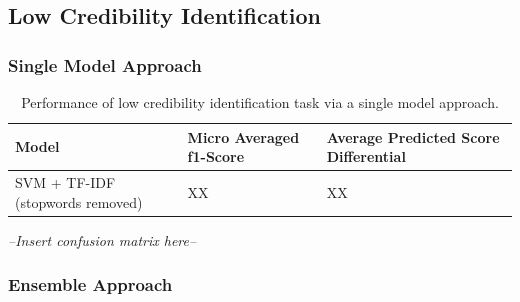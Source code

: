 \documentclass[a4paper,twoside,phd]{BYUPhys}
\begin{document}
\subsection{Low Credibility Identification}
\label{sec:LowCredibilityIdentificationResults}

\subsubsection{Single Model Approach}
\label{sec:SingleModelApproachResults}
\begin{table}[H]
	\centering
	
	\begin{tabular}{|p{4cm}|p{4cm}|p{4cm}|}
		\hline
		
		\textbf{Model} & \textbf{Micro Averaged \newline f1-Score} & \textbf{Average Predicted Score Differential}                                                                                                                                                                                                                                                                                                                                           \\
		\hline                                                                                                                                              
		
		SVM + TF-IDF \newline (stopwords removed)  & XX & XX \\
		\hline
		
		
		
	\end{tabular}
	\caption{Performance of low credibility identification task via a single model approach.}
	\label{table:SingleModelApproach}
\end{table}

\textit{--Insert confusion matrix here--}

\subsubsection{Ensemble Approach}
\label{sec:EnsembleApproachResults}
\end{document}
